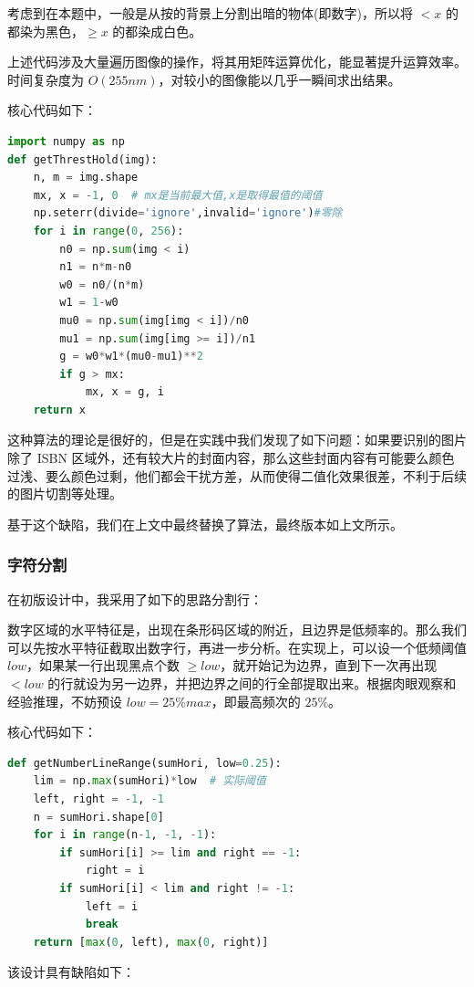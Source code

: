 \documentclass{ctexart}
\begin{document}
考虑到在本题中，一般是从按的背景上分割出暗的物体(即数字)，所以将 $< x$ 的都染为黑色，$\ge x$ 的都染成白色。

上述代码涉及大量遍历图像的操作，将其用矩阵运算优化，能显著提升运算效率。时间复杂度为 $O(255nm)$，对较小的图像能以几乎一瞬间求出结果。

核心代码如下：
\begin{lstlisting}[language=python]
import numpy as np
def getThrestHold(img):
    n, m = img.shape
    mx, x = -1, 0  # mx是当前最大值,x是取得最值的阈值
    np.seterr(divide='ignore',invalid='ignore')#零除
    for i in range(0, 256):
        n0 = np.sum(img < i)
        n1 = n*m-n0
        w0 = n0/(n*m)
        w1 = 1-w0
        mu0 = np.sum(img[img < i])/n0
        mu1 = np.sum(img[img >= i])/n1
        g = w0*w1*(mu0-mu1)**2
        if g > mx:
            mx, x = g, i
    return x
\end{lstlisting}

这种算法的理论是很好的，但是在实践中我们发现了如下问题：如果要识别的图片除了 ISBN 区域外，还有较大片的封面内容，那么这些封面内容有可能要么颜色过浅、要么颜色过剩，他们都会干扰方差，从而使得二值化效果很差，不利于后续的图片切割等处理。

基于这个缺陷，我们在上文中最终替换了算法，最终版本如上文所示。

\subsubsection{字符分割}
在初版设计中，我采用了如下的思路分割行：

数字区域的水平特征是，出现在条形码区域的附近，且边界是低频率的。那么我们可以先按水平特征截取出数字行，再进一步分析。在实现上，可以设一个低频阈值 $low$，如果某一行出现黑点个数 $\ge low$，就开始记为边界，直到下一次再出现 $< low$ 的行就设为另一边界，并把边界之间的行全部提取出来。根据肉眼观察和经验推理，不妨预设 $low=25\%max$，即最高频次的 $25\%$。

核心代码如下：
\begin{lstlisting}[language=python]
def getNumberLineRange(sumHori, low=0.25):
    lim = np.max(sumHori)*low  # 实际阈值
    left, right = -1, -1
    n = sumHori.shape[0]
    for i in range(n-1, -1, -1):
        if sumHori[i] >= lim and right == -1:
            right = i
        if sumHori[i] < lim and right != -1:
            left = i
            break
    return [max(0, left), max(0, right)]
\end{lstlisting}

该设计具有缺陷如下：
\end{document}
